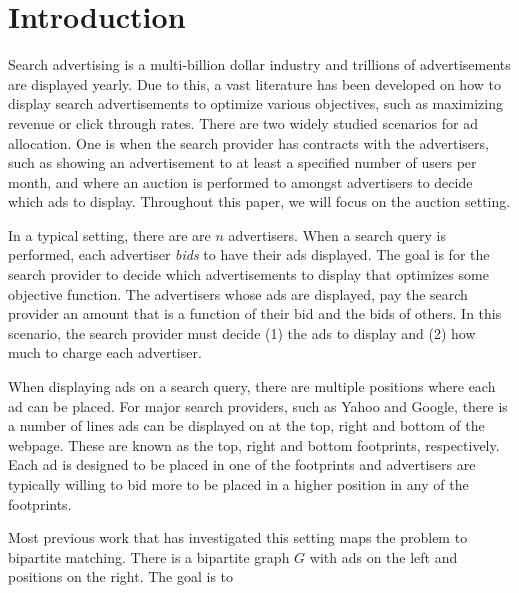 \section{Introduction}
\label{sec:intro}

Search advertising is a multi-billion dollar industry and trillions of advertisements are displayed yearly.  Due to this, a vast literature has been developed on how to display search advertisements to optimize various objectives, such as maximizing revenue or click through rates. There are two widely studied scenarios for ad allocation.  One is when the search provider has contracts with the advertisers, such as showing an advertisement to at least a specified number of users per month, and where an auction is performed to amongst advertisers to decide which ads to display.  Throughout this paper, we will focus on the auction setting. 


 In a typical setting, there are  are $n$ advertisers.  When a search query is performed, each advertiser \emph{bids} to have their ads displayed.  The goal is for the search provider to decide which advertisements to display that optimizes some objective function.  The advertisers whose ads are displayed, pay the search provider an amount that is a function of their bid and the bids of others.  In this scenario, the search provider must decide (1) the ads to display and (2) how much to charge each advertiser.
 
When displaying ads on a search query, there are multiple positions where each ad can be placed. For major search providers, such as Yahoo and Google, there is a number of lines ads can be displayed on at the top, right and bottom of the webpage.  These are known as the top, right and bottom footprints, respectively.  Each ad is designed to be placed in one of the footprints and advertisers are typically willing to bid more to be placed in a higher position in any of the footprints.
 
 Most previous work that has investigated this setting maps the problem to bipartite matching.  There is a bipartite graph $G$ with ads on the left and positions on the right. The goal is to  




